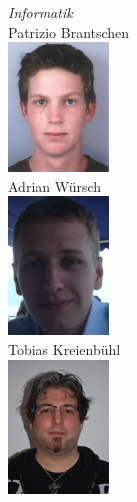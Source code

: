 \hfill


\begin{minipage}{0.4\textwidth}
\begin{flushright} \large
\emph{Informatik}\\
Patrizio Brantschen\\
\includegraphics[width=0.2\textwidth]{./04_Projektmanagement/fig/patriziobrantschen.jpg}\\
Adrian Würsch\\
\includegraphics[width=0.2\textwidth]{./04_Projektmanagement/fig/adrianwuersch.jpg}\\
Tobias Kreienbühl\\
\includegraphics[width=0.2\textwidth]{./04_Projektmanagement/fig/tobiaskreienbuehl.jpg}\\
\end{flushright}
\end{minipage}










